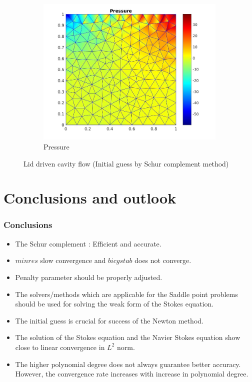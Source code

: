 \documentclass{beamer}
\begin{document}
\begin{frame}
\begin{figure}
\begin{subfigure}{0.3\textwidth}
    \includegraphics[width=\linewidth]{lid_newton_pressure_schur.jpg}
    \caption{Pressure}
  \label{pressure_navier_stoke_schur_lid}
  \end{subfigure}
\caption{Lid driven cavity flow (Initial guess by Schur complement method)}
\label{lid_driven_cavity_n_s_schur}
\end{figure}
\end{frame}
\section{Conclusions and outlook}
\begin{frame}
\frametitle{Conclusions}
\begin{itemize}

\item The Schur complement : Efficient and accurate.
\item $minres$ slow convergence and $bicgstab$ does not converge.
\item Penalty parameter should be properly adjusted.
\item The solvers/methods which are applicable for the Saddle point problems should be used for solving the weak form of the Stokes equation.
\item The initial guess is crucial for success of the Newton method.
\item The solution of the Stokes equation and the Navier Stokes equation show close to linear convergence in $L^2$ norm.
\item The higher polynomial degree does not always guarantee better accuracy. However, the convergence rate increases with increase in polynomial degree.

\end{itemize}


\end{frame}
\end{document}
